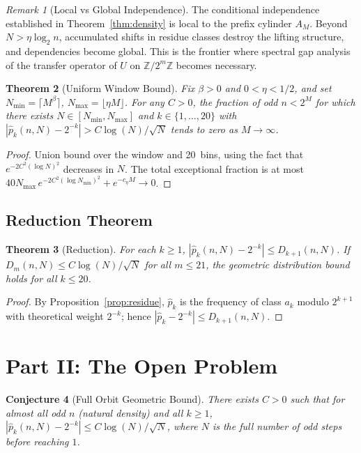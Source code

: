 \documentclass[12pt]{article}
\newtheorem{theorem}{Theorem}
\newtheorem{conjecture}[theorem]{Conjecture}
\theoremstyle{definition}
\theoremstyle{remark}
\newtheorem{remark}[theorem]{Remark}
\begin{document}
\begin{remark}[Local vs Global Independence]
The conditional independence established in Theorem~\ref{thm:density}
is local to the prefix cylinder $A_M$.
Beyond $N>\eta\log_2 n$, accumulated shifts in residue classes destroy
the lifting structure, and dependencies become global.
This is the frontier where spectral gap analysis of the transfer operator
of $U$ on $\mathbb{Z}/2^m\mathbb{Z}$ becomes necessary.
\end{remark}

\begin{theorem}[Uniform Window Bound]\label{thm:window}
Fix $\beta>0$ and $0<\eta<1/2$, and set
$N_{\min}=\lceil M^\beta\rceil$, $N_{\max}=\lfloor\eta M\rfloor$.
For any $C>0$, the fraction of odd $n<2^M$ for which there exists
$N\in[N_{\min},N_{\max}]$ and $k\in\{1,\ldots,20\}$ with
$|\hat{p}_k(n,N)-2^{-k}|>C\log(N)/\sqrt{N}$ tends to zero as $M\to\infty$.
\end{theorem}

\begin{proof}
Union bound over the window and 20~bins, using the fact that
$e^{-2C^2(\log N)^2}$ decreases in $N$.
The total exceptional fraction is at most
$40N_{\max}\,e^{-2C^2(\log N_{\min})^2}+e^{-c_\eta M}\to 0$.
\end{proof}

\subsection{Reduction Theorem}

\begin{theorem}[Reduction]\label{thm:reduction}
For each $k\geq 1$, $|\hat{p}_k(n,N)-2^{-k}|\leq D_{k+1}(n,N)$.
If $D_m(n,N)\leq C\log(N)/\sqrt{N}$ for all $m\leq 21$,
the geometric distribution bound holds for all $k\leq 20$.
\end{theorem}

\begin{proof}
By Proposition~\ref{prop:residue}, $\hat{p}_k$ is the frequency of
class $a_k$ modulo $2^{k+1}$ with theoretical weight $2^{-k}$;
hence $|\hat{p}_k-2^{-k}|\leq D_{k+1}(n,N)$.
\end{proof}

\section{Part II: The Open Problem}\label{sec:gap}

\begin{conjecture}[Full Orbit Geometric Bound]\label{conj:main}
There exists $C>0$ such that for almost all odd $n$ (natural density)
and all $k\geq 1$,
$|\hat{p}_k(n,N)-2^{-k}|\leq C\log(N)/\sqrt{N}$,
where $N$ is the full number of odd steps before reaching $1$.
\end{conjecture}
\end{document}
